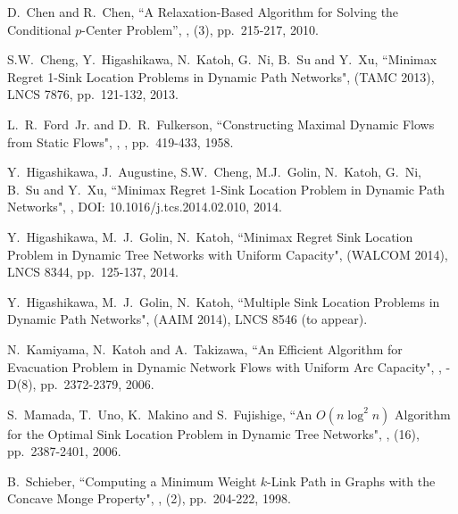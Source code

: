 \documentclass[a4paper]{llncs}
\begin{document}
\begin{thebibliography}{99}
		D.~Chen and R.~Chen, 
		\newblock ``A Relaxation-Based Algorithm for Solving the Conditional $p$-Center Problem'', 
		,
		(3), pp.~215-217, 2010.

		S.W.~Cheng, Y.~Higashikawa, N.~Katoh, G.~Ni, B.~Su and Y.~Xu,
		\newblock ``Minimax Regret 1-Sink Location Problems in Dynamic Path Networks",
		 (TAMC 2013),
		\newblock LNCS 7876, pp.~121-132, 2013.

		L.~R.~Ford~Jr. and D.~R.~Fulkerson,
		\newblock ``Constructing Maximal Dynamic Flows from Static Flows",
		,
		, pp.~419-433, 1958.	
			
		Y.~Higashikawa, J.~Augustine, S.W.~Cheng, M.J.~Golin, N.~Katoh, G.~Ni, B.~Su and Y.~Xu,
		\newblock ``Minimax Regret 1-Sink Location Problem in Dynamic Path Networks",
		,
		\newblock DOI: 10.1016/j.tcs.2014.02.010, 2014.		
	
		Y.~Higashikawa, M.~J.~Golin, N.~Katoh,
		\newblock ``Minimax Regret Sink Location Problem in Dynamic Tree Networks with Uniform Capacity",
		 (WALCOM 2014),
		\newblock LNCS 8344, pp.~125-137, 2014.
	
		Y.~Higashikawa, M.~J.~Golin, N.~Katoh,
		\newblock ``Multiple Sink Location Problems in Dynamic Path Networks",
		 (AAIM 2014),
		\newblock LNCS 8546 (to appear).	
					
		N.~Kamiyama, N.~Katoh and A.~Takizawa, 
		\newblock ``An Efficient Algorithm for Evacuation Problem in Dynamic Network Flows with Uniform Arc Capacity",
		,
		-D(8), pp.~2372-2379, 2006. 
	
		S.~Mamada, T.~Uno, K.~Makino and S.~Fujishige,
		\newblock ``An $O(n \log^2 n)$ Algorithm for the Optimal Sink Location Problem in Dynamic Tree Networks",
		,
		(16), pp.~2387-2401, 2006. 
		
		B.~Schieber,
		\newblock ``Computing a Minimum Weight $k$-Link Path in Graphs with the Concave Monge Property",
		,
		(2), pp.~204-222, 1998. 		
		 
\end{thebibliography}
\end{document}
